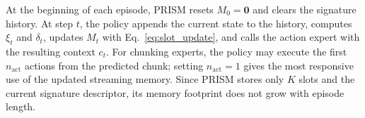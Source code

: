 At the beginning of each episode, PRISM resets $M_0=\mathbf{0}$ and clears the
signature history. At step $t$, the policy appends the current state to the
history, computes $\xi_t$ and $\delta_t$, updates $M_t$ with
Eq.~\eqref{eq:slot_update}, and calls the action expert with the resulting
context $c_t$. For chunking experts, the policy may execute the first
$n_{\mathrm{act}}$ actions from the predicted chunk; setting
$n_{\mathrm{act}}=1$ gives the most responsive use of the updated streaming
memory. Since PRISM stores only $K$ slots and the current signature descriptor,
its memory footprint does not grow with episode length.
